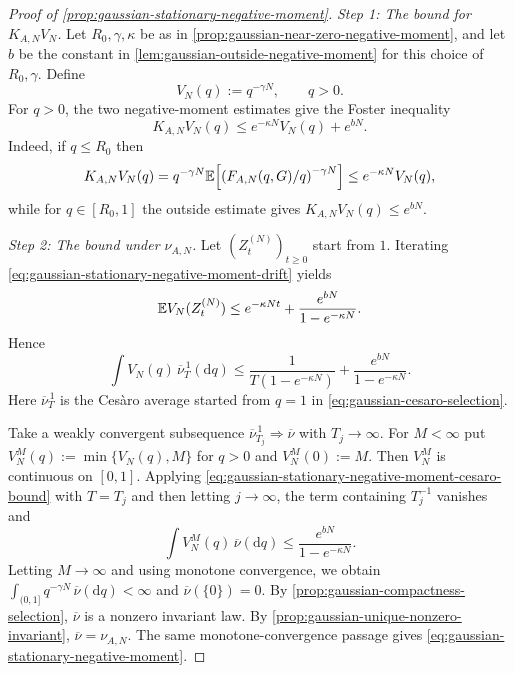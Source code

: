 \documentclass[11pt,reqno,a4paper]{article}
\newcommand{\Ee}{\E}
\begin{document}
\begin{proof}[Proof of \cref{prop:gaussian-stationary-negative-moment}]
  \emph{Step 1: The bound for $K_{A,N}V_N$.}
  Let $R_0,\gamma,\kappa$ be as in
  \cref{prop:gaussian-near-zero-negative-moment}, and let $b$ be the constant
  in \cref{lem:gaussian-outside-negative-moment} for this choice of
  $R_0,\gamma$. Define
  \begin{equation*}
    V_N(q):=q^{-\gamma N},
    \qquad q>0.
  \end{equation*}
  For $q>0$, the two negative-moment estimates give the Foster inequality
  \begin{equation}\label{eq:gaussian-stationary-negative-moment-drift}
    K_{A,N}V_N(q)
    \leq
    e^{-\kappa N}V_N(q)+e^{bN}.
  \end{equation}
  Indeed, if $q\leq R_0$ then
  \begin{equation*}
    K_{A,N}V_N(q)
    =
    q^{-\gamma N}
    \Ee\left[\left(F_{A,N}(q,G)/q\right)^{-\gamma N}\right]
    \leq
    e^{-\kappa N}V_N(q),
  \end{equation*}
  while for $q\in[R_0,1]$ the outside estimate gives
  $K_{A,N}V_N(q)\leq e^{bN}$.

  \emph{Step 2: The bound under $\nu_{A,N}$.}
  Let $(Z_t^{(N)})_{t\geq0}$ start from $1$. Iterating
  \cref{eq:gaussian-stationary-negative-moment-drift} yields
  \begin{equation}\label{eq:gaussian-stationary-negative-moment-iteration}
    \Ee V_N(Z_t^{(N)})
    \leq
    e^{-\kappa Nt}
    +
    \frac{e^{bN}}{1-e^{-\kappa N}}.
  \end{equation}
  Hence
  \begin{equation}\label{eq:gaussian-stationary-negative-moment-cesaro-bound}
    \int V_N(q)\,\overline\nu_T^{\,1}(\mathrm{d}q)
    \leq
    \frac{1}{T(1-e^{-\kappa N})}
    +
    \frac{e^{bN}}{1-e^{-\kappa N}}.
  \end{equation}
  Here $\overline\nu_T^{\,1}$ is the Cesàro average started from $q=1$ in
  \cref{eq:gaussian-cesaro-selection}.

  Take a weakly convergent subsequence
  $\overline\nu_{T_j}^{\,1}\Rightarrow\overline\nu$ with $T_j\to\infty$.
  For $M<\infty$ put $V_N^M(q):=\min\{V_N(q),M\}$ for $q>0$ and
  $V_N^M(0):=M$. Then $V_N^M$ is continuous on $[0,1]$. Applying
  \cref{eq:gaussian-stationary-negative-moment-cesaro-bound} with $T=T_j$ and
  then letting $j\to\infty$, the term containing $T_j^{-1}$ vanishes and
  \begin{equation*}
    \int V_N^M(q)\,\overline\nu(\mathrm{d}q)
    \leq
    \frac{e^{bN}}{1-e^{-\kappa N}}.
  \end{equation*}
  Letting $M\to\infty$ and using monotone convergence, we obtain
  $\int_{(0,1]}q^{-\gamma N}\,\overline\nu(\mathrm{d}q)<\infty$ and
  $\overline\nu(\{0\})=0$. By \cref{prop:gaussian-compactness-selection},
  $\overline\nu$ is a nonzero invariant law. By
  \cref{prop:gaussian-unique-nonzero-invariant},
  $\overline\nu=\nu_{A,N}$. The same monotone-convergence passage gives
  \cref{eq:gaussian-stationary-negative-moment}.
\end{proof}
\end{document}
